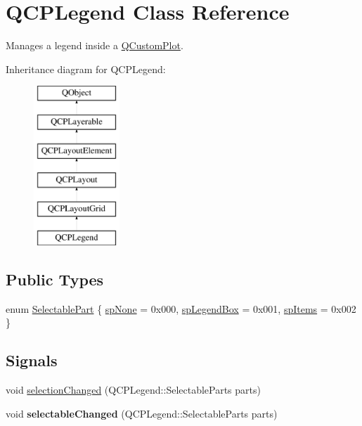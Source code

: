 \hypertarget{class_q_c_p_legend}{}\section{Q\+C\+P\+Legend Class Reference}
\label{class_q_c_p_legend}


Manages a legend inside a \hyperlink{class_q_custom_plot}{Q\+Custom\+Plot}.  


Inheritance diagram for Q\+C\+P\+Legend\+:\begin{figure}[H]
\begin{center}
\leavevmode
\includegraphics[height=6.000000cm]{class_q_c_p_legend}
\end{center}
\end{figure}
\subsection*{Public Types}
\begin{DoxyCompactItemize}
\item 
enum \hyperlink{class_q_c_p_legend_a5404de8bc1e4a994ca4ae69e2c7072f1}{Selectable\+Part} \{ \hyperlink{class_q_c_p_legend_a5404de8bc1e4a994ca4ae69e2c7072f1a378201c07d500af7126e3ec91652eed7}{sp\+None} = 0x000, 
\hyperlink{class_q_c_p_legend_a5404de8bc1e4a994ca4ae69e2c7072f1a0fa4758962a46fa1dc9da818abae23c4}{sp\+Legend\+Box} = 0x001, 
\hyperlink{class_q_c_p_legend_a5404de8bc1e4a994ca4ae69e2c7072f1a768bfb95f323db4c66473375032c0af7}{sp\+Items} = 0x002
 \}
\end{DoxyCompactItemize}
\subsection*{Signals}
\begin{DoxyCompactItemize}
\item 
void \hyperlink{class_q_c_p_legend_a82c88464edac07a9eefaf3906268df3b}{selection\+Changed} (Q\+C\+P\+Legend\+::\+Selectable\+Parts parts)
\item 
\mbox{\label{class_q_c_p_legend_a8a77300fd0976d6bdd8000f4e8d114b8}} 
void {\bfseries selectable\+Changed} (Q\+C\+P\+Legend\+::\+Selectable\+Parts parts)
\end{DoxyCompactItemize}
